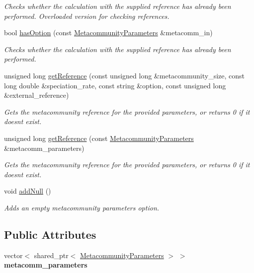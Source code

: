 \begin{DoxyCompactItemize}
\begin{DoxyCompactList}\small\item\em Checks whether the calculation with the supplied reference has already been performed. Overloaded version for checking references. \end{DoxyCompactList}\item 
bool \hyperlink{struct_metacommunities_array_a3919ab2082db032eb3b1fe1c39201789}{has\+Option} (const \hyperlink{struct_metacommunity_parameters}{Metacommunity\+Parameters} \&metacomm\+\_\+in)
\begin{DoxyCompactList}\small\item\em Checks whether the calculation with the supplied reference has already been performed. \end{DoxyCompactList}\item 
unsigned long \hyperlink{struct_metacommunities_array_a8c1b6836f052ebb4fe2bb3c8833e3d6e}{get\+Reference} (const unsigned long \&metacommunity\+\_\+size, const long double \&speciation\+\_\+rate, const string \&option, const unsigned long \&external\+\_\+reference)
\begin{DoxyCompactList}\small\item\em Gets the metacommunity reference for the provided parameters, or returns 0 if it doesn\textquotesingle{}t exist. \end{DoxyCompactList}\item 
unsigned long \hyperlink{struct_metacommunities_array_aeeff79f170f9d4c5198c1b0373843504}{get\+Reference} (const \hyperlink{struct_metacommunity_parameters}{Metacommunity\+Parameters} \&metacomm\+\_\+parameters)
\begin{DoxyCompactList}\small\item\em Gets the metacommunity reference for the provided parameters, or returns 0 if it doesn\textquotesingle{}t exist. \end{DoxyCompactList}\item 
void \hyperlink{struct_metacommunities_array_afea47da3543504b7aac4bd02ba8e290f}{add\+Null} ()\hypertarget{struct_metacommunities_array_afea47da3543504b7aac4bd02ba8e290f}{}\label{struct_metacommunities_array_afea47da3543504b7aac4bd02ba8e290f}

\begin{DoxyCompactList}\small\item\em Adds an empty metacommunity parameters option. \end{DoxyCompactList}\end{DoxyCompactItemize}
\subsection*{Public Attributes}
\begin{DoxyCompactItemize}
\item 
vector$<$ shared\+\_\+ptr$<$ \hyperlink{struct_metacommunity_parameters}{Metacommunity\+Parameters} $>$ $>$ {\bfseries metacomm\+\_\+parameters}\hypertarget{struct_metacommunities_array_a869cfa9f4c99ed20d8e10d9d4f0a409a}{}\label{struct_metacommunities_array_a869cfa9f4c99ed20d8e10d9d4f0a409a}

\end{DoxyCompactItemize}


